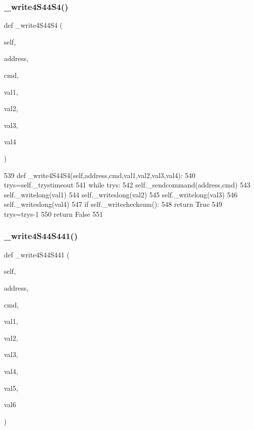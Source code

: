 \subsubsection{\texorpdfstring{\+\_\+write4\+S44\+S4()}{\_write4S44S4()}}
{\footnotesize\ttfamily def \+\_\+write4\+S44\+S4 (\begin{DoxyParamCaption}\item[{}]{self,  }\item[{}]{address,  }\item[{}]{cmd,  }\item[{}]{val1,  }\item[{}]{val2,  }\item[{}]{val3,  }\item[{}]{val4 }\end{DoxyParamCaption})\hspace{0.3cm}{\ttfamily [private]}}


\begin{DoxyCode}
539     \textcolor{keyword}{def }\_write4S44S4(self,address,cmd,val1,val2,val3,val4):
540         trys=self.\_trystimeout
541         \textcolor{keywordflow}{while} trys:
542             self.\_sendcommand(address,cmd)
543             self.\_writelong(val1)
544             self.\_writeslong(val2)
545             self.\_writelong(val3)
546             self.\_writeslong(val4)
547             \textcolor{keywordflow}{if} self.\_writechecksum():
548                 \textcolor{keywordflow}{return} \textcolor{keyword}{True}
549             trys=trys-1
550         \textcolor{keywordflow}{return} \textcolor{keyword}{False}
551 
\end{DoxyCode}
\mbox{\label{classtoxic__hardware_1_1roboclaw__3_1_1Roboclaw_a9e7a5eedc686f4e157db9c01b9b09371}} 
\subsubsection{\texorpdfstring{\+\_\+write4\+S44\+S441()}{\_write4S44S441()}}
{\footnotesize\ttfamily def \+\_\+write4\+S44\+S441 (\begin{DoxyParamCaption}\item[{}]{self,  }\item[{}]{address,  }\item[{}]{cmd,  }\item[{}]{val1,  }\item[{}]{val2,  }\item[{}]{val3,  }\item[{}]{val4,  }\item[{}]{val5,  }\item[{}]{val6 }\end{DoxyParamCaption})\hspace{0.3cm}{\ttfamily [private]}}


